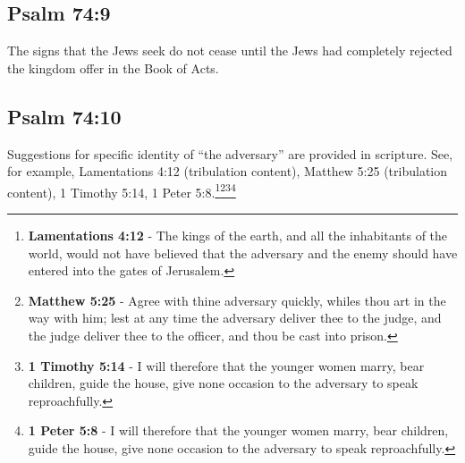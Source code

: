 \subsection{Psalm 74:9}
The signs that the Jews seek do not cease until the Jews had completely rejected the kingdom offer in the Book of Acts. 

\subsection{Psalm 74:10}
Suggestions for specific identity of ``the adversary'' are provided in scripture. See, for example, Lamentations 4:12 (tribulation content), Matthew 5:25 (tribulation content), 1 Timothy 5:14, 1 Peter 5:8.\footnote{\textbf{Lamentations 4:12} - The kings of the earth, and all the inhabitants of the world, would not have believed that the adversary and the enemy should have entered into the gates of Jerusalem.}\footnote{\textbf{Matthew 5:25} - Agree with thine adversary quickly, whiles thou art in the way with him; lest at any time the adversary deliver thee to the judge, and the judge deliver thee to the officer, and thou be cast into prison.}\footnote{\textbf{1 Timothy 5:14} - I will therefore that the younger women marry, bear children, guide the house, give none occasion to the adversary to speak reproachfully.}\footnote{\textbf{1 Peter 5:8} - I will therefore that the younger women marry, bear children, guide the house, give none occasion to the adversary to speak reproachfully.}
